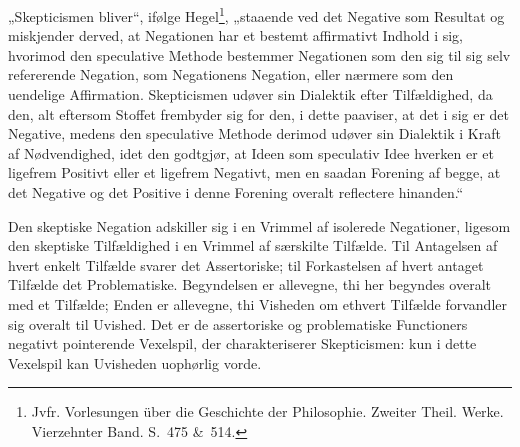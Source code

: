 \documentclass[12pt]{book}
\newcommand{\opage}[1]{\marginnote{\footnotesize\textit{[#1]}}}
\begin{document}
„Skepticismen bliver“, ifølge Hegel\footnote{Jvfr. Vorlesungen über die Geschichte der Philosophie. Zweiter Theil. Werke. Vierzehnter Band. S.~475 \&\ 514.}, %
„staaende ved det Negative som Resultat og miskjender derved, at Negationen har et bestemt affirmativt Indhold i sig, hvorimod den speculative Methode bestemmer Negationen som den sig til sig selv refererende Negation, som Negationens Negation, eller nærmere som den uendelige Affirmation. Skepticismen udøver sin Dialektik efter Tilfældighed, da den, alt eftersom Stoffet frembyder sig for den, i dette paaviser, at det i sig er det Negative, medens den speculative Methode derimod udøver sin Dialektik i Kraft af Nødvendighed, idet den godtgjør, at Ideen som speculativ Idee hverken er et ligefrem Positivt eller et ligefrem Negativt, men en saadan Forening af begge, at det Negative og det Positive i denne Forening overalt reflectere hinanden.“

\opage{220}Den skeptiske Negation adskiller sig i en Vrimmel af isolerede Negationer, ligesom den skeptiske Tilfældighed i en Vrimmel af særskilte Tilfælde. Til Antagelsen af hvert enkelt Tilfælde svarer det Assertoriske; til Forkastelsen af hvert antaget Tilfælde det Problematiske. Begyndelsen er allevegne, thi her begyndes overalt med et Tilfælde; Enden er allevegne, thi Visheden om ethvert Tilfælde forvandler sig overalt til Uvished. Det er de assertoriske og problematiske Functioners negativt pointerende Vexelspil, der charakteriserer Skepticismen: kun i dette Vexelspil kan Uvisheden uophørlig vorde.
\end{document}

